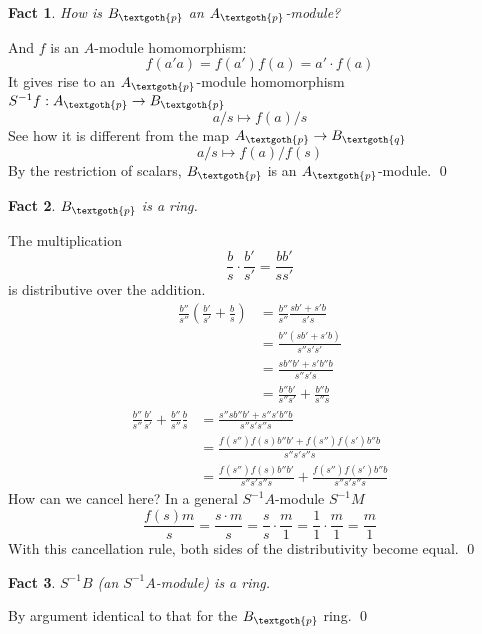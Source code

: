 \documentclass{article}
\newtheorem{theorem}{Fact}[section]
\begin{document}
\begin{theorem}
How is $B_\textgoth{p}$ an $A_\textgoth{p}$-module?
\end{theorem}

\noindent
And $f$ is an $A$-module homomorphism:
\[
f(a'a) = f(a')f(a) = a' \cdot f(a)
\]
It gives rise to an $A_\textgoth{p}$-module homomorphism $S^{-1}f: A_\textgoth{p} \rightarrow B_\textgoth{p}$
\[
a/s \mapsto f(a)/s
\]
See how it is different from the map $A_\textgoth{p} \rightarrow B_\textgoth{q}$
\[
a/s \mapsto f(a)/f(s)
\]
By the restriction of scalars, $B_\textgoth{p}$ is an $A_\textgoth{p}$-module.
\qed

\begin{theorem}
$B_\textgoth{p}$ is a ring.
\end{theorem}

\noindent
The multiplication 
\[
\frac{b}{s} \cdot \frac{b'}{s'} = \frac{bb'}{ss'}
\]
is distributive over the addition.
\begin{equation*}
\begin{split}
\frac{b''}{s''} \left( \frac{b'}{s'} + \frac{b}{s} \right)
& = \frac{b''}{s''}\frac{sb' + s'b}{s's} \\
& = \frac{b''(sb' + s'b)}{s''s's'} \\
& = \frac{sb''b' + s'b''b}{s''s's} \\
& = \frac{b''b'}{s''s'} + \frac{b''b}{s''s}
\end{split}
\end{equation*}
\begin{equation*}
\begin{split}
\frac{b''}{s''} \frac{b'}{s'} + \frac{b''}{s''} \frac{b}{s}
& = \frac{s''sb''b' + s''s'b''b}{s''s's''s} \\
& = \frac{f(s'')f(s)b''b' + f(s'')f(s')b''b}{s''s's''s} \\
& = \frac{f(s'')f(s)b''b'}{s''s's''s} + \frac{f(s'')f(s')b''b}{s''s's''s}
\end{split}
\end{equation*}
How can we cancel here? In a general $S^{-1}A$-module $S^{-1}M$
\[
\frac{f(s)m}{s} = \frac{s \cdot m}{s} = \frac{s}{s} \cdot \frac{m}{1} = \frac{1}{1} \cdot \frac{m}{1} = \frac{m}{1}
\]
With this cancellation rule, both sides of the distributivity become equal.
\qed

\begin{theorem}
$S^{-1}B$ (an $S^{-1}A$-module)  is a ring.
\end{theorem}

\noindent
By argument identical to that for the $B_\textgoth{p}$ ring.
\qed
\end{document}
